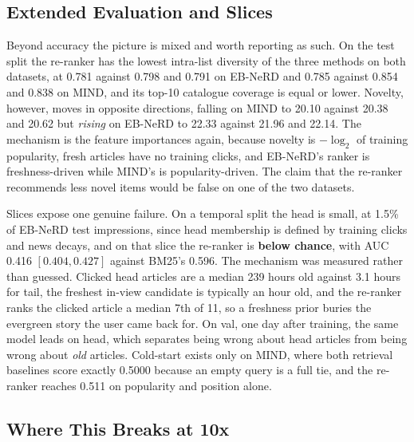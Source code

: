 \documentclass[11pt]{article}
\begin{document}
\subsection{Extended Evaluation and Slices}
\label{sec:ablation}

Beyond accuracy the picture is mixed and worth reporting as such. On the test
split the re-ranker has the lowest intra-list diversity of the three methods
on both datasets, at 0.781 against 0.798 and 0.791 on EB-NeRD and 0.785
against 0.854 and 0.838 on MIND, and its top-10 catalogue coverage is equal or
lower. Novelty, however, moves in opposite directions, falling on MIND to
20.10 against 20.38 and 20.62 but \emph{rising} on EB-NeRD to 22.33 against
21.96 and 22.14. The mechanism is the feature importances again, because
novelty is $-\log_2$ of training popularity, fresh articles have no training
clicks, and EB-NeRD's ranker is freshness-driven while MIND's is
popularity-driven. The claim that the re-ranker recommends less novel items
would be false on one of the two datasets.

Slices expose one genuine failure. On a temporal split the head is small, at
1.5\% of EB-NeRD test impressions, since head membership is defined by
training clicks and news decays, and on that slice the re-ranker is
\textbf{below chance}, with AUC 0.416 $[0.404, 0.427]$ against BM25's 0.596.
The mechanism was measured rather than guessed. Clicked head articles are a
median 239 hours old against 3.1 hours for tail, the freshest in-view
candidate is typically an hour old, and the re-ranker ranks the clicked
article a median 7th of 11, so a freshness prior buries the evergreen story
the user came back for. On val, one day after training, the same model leads
on head, which separates being wrong about head articles from being wrong
about \emph{old} articles. Cold-start exists only on MIND, where both
retrieval baselines score exactly 0.5000 because an empty query is a full tie,
and the re-ranker reaches 0.511 on popularity and position alone.

\subsection{Where This Breaks at 10x}
\label{sec:scaling}
\end{document}
